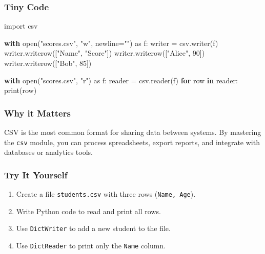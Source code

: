 \documentclass[
  letterpaper,
  DIV=11,
  numbers=noendperiod]{scrreprt}
\newenvironment{Shaded}{\begin{snugshade}}{\end{snugshade}}
\newcommand{\BuiltInTok}[1]{\textcolor[rgb]{0.00,0.23,0.31}{#1}}
\newcommand{\ControlFlowTok}[1]{\textcolor[rgb]{0.00,0.23,0.31}{\textbf{#1}}}
\newcommand{\DecValTok}[1]{\textcolor[rgb]{0.68,0.00,0.00}{#1}}
\newcommand{\ImportTok}[1]{\textcolor[rgb]{0.00,0.46,0.62}{#1}}
\newcommand{\KeywordTok}[1]{\textcolor[rgb]{0.00,0.23,0.31}{\textbf{#1}}}
\newcommand{\NormalTok}[1]{\textcolor[rgb]{0.00,0.23,0.31}{#1}}
\newcommand{\OperatorTok}[1]{\textcolor[rgb]{0.37,0.37,0.37}{#1}}
\newcommand{\StringTok}[1]{\textcolor[rgb]{0.13,0.47,0.30}{#1}}
\providecommand{\tightlist}{%
  \setlength{\itemsep}{0pt}\setlength{\parskip}{0pt}}
\begin{document}
\subsubsection{Tiny Code}\label{tiny-code-56}

\begin{Shaded}
\begin{Highlighting}[]
\ImportTok{import}\NormalTok{ csv}

\ControlFlowTok{with} \BuiltInTok{open}\NormalTok{(}\StringTok{"scores.csv"}\NormalTok{, }\StringTok{"w"}\NormalTok{, newline}\OperatorTok{=}\StringTok{""}\NormalTok{) }\ImportTok{as}\NormalTok{ f:}
\NormalTok{    writer }\OperatorTok{=}\NormalTok{ csv.writer(f)}
\NormalTok{    writer.writerow([}\StringTok{"Name"}\NormalTok{, }\StringTok{"Score"}\NormalTok{])}
\NormalTok{    writer.writerow([}\StringTok{"Alice"}\NormalTok{, }\DecValTok{90}\NormalTok{])}
\NormalTok{    writer.writerow([}\StringTok{"Bob"}\NormalTok{, }\DecValTok{85}\NormalTok{])}

\ControlFlowTok{with} \BuiltInTok{open}\NormalTok{(}\StringTok{"scores.csv"}\NormalTok{, }\StringTok{"r"}\NormalTok{) }\ImportTok{as}\NormalTok{ f:}
\NormalTok{    reader }\OperatorTok{=}\NormalTok{ csv.reader(f)}
    \ControlFlowTok{for}\NormalTok{ row }\KeywordTok{in}\NormalTok{ reader:}
        \BuiltInTok{print}\NormalTok{(row)}
\end{Highlighting}
\end{Shaded}

\subsubsection{Why it Matters}\label{why-it-matters-56}

CSV is the most common format for sharing data between systems. By
mastering the \texttt{csv} module, you can process spreadsheets, export
reports, and integrate with databases or analytics tools.

\subsubsection{Try It Yourself}\label{try-it-yourself-56}

\begin{enumerate}
\def\labelenumi{\arabic{enumi}.}
\tightlist
\item
  Create a file \texttt{students.csv} with three rows
  (\texttt{Name,\ Age}).
\item
  Write Python code to read and print all rows.
\item
  Use \texttt{DictWriter} to add a new student to the file.
\item
  Use \texttt{DictReader} to print only the \texttt{Name} column.
\end{enumerate}
\end{document}
